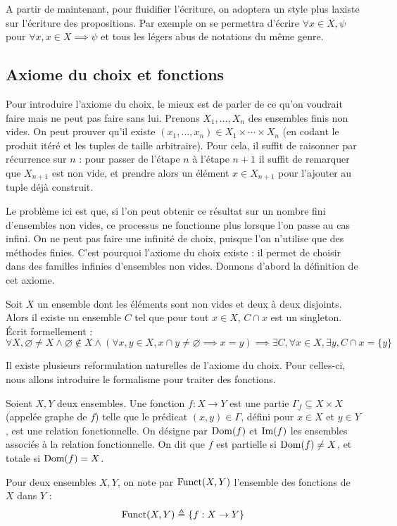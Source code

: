 \begin{notation}
  A partir de maintenant, pour fluidifier l'écriture, on adoptera un style plus
  laxiste sur l'écriture des propositions. Par exemple on se permettra d'écrire
  $\forall x \in X, \psi$ pour $\forall x, x\in X \implies \psi$ et tous les
  légers abus de notations du même genre.
\end{notation}

\subsection{Axiome du choix et fonctions}

Pour introduire l'axiome du choix, le mieux est de parler de ce qu'on voudrait
faire mais ne peut pas faire sans lui. Prenons $X_1,\ldots,X_n$ des ensembles
finis non vides. On peut prouver qu'il existe
$(x_1,\ldots,x_n)\in X_1\times\cdots\times X_n$ (en codant le produit itéré et
les tuples de taille arbitraire). Pour cela, il suffit de raisonner par
récurrence sur $n$ : pour passer de l'étape $n$ à l'étape $n+1$ il suffit de
remarquer que $X_{n+1}$ est non vide, et prendre alors un élément $x\in X_{n+1}$
pour l'ajouter au tuple déjà construit.

Le problème ici est que, si l'on peut obtenir ce résultat sur un nombre fini
d'ensembles non vides, ce processus ne fonctionne plus lorsque l'on passe au cas
infini. On ne peut pas faire une infinité de choix, puisque l'on n'utilise que
des méthodes finies. C'est pourquoi l'axiome du choix existe : il permet de
choisir dans des familles infinies d'ensembles non vides. Donnons d'abord la
définition de cet axiome.

\begin{axiom}[Choix]\label{ax.ZF.AC}
  Soit $X$ un ensemble dont les éléments sont non vides et deux à deux
  disjoints. Alors il existe un ensemble $C$ tel que pour tout $x\in X$,
  $C\cap x$ est un singleton. \'Ecrit formellement :
  \[
  \forall X, \varnothing\neq X \land \varnothing\notin X \land
  (\forall x,y \in X, x \cap y \neq
  \varnothing \implies x = y)
  \implies \exists C, \forall x \in X, \exists y, C \cap x = \{y\}
  \]
\end{axiom}

Il existe plusieurs reformulation naturelles de l'axiome du choix. Pour
celles-ci, nous allons introduire le formalisme pour traiter des fonctions.

\begin{definition}[Fonction]
  Soient $X,Y$ deux ensembles. Une fonction $f : X \to Y$ est une partie
  $\Gamma_f\subseteq X \times X$ (appelée graphe de $f$)  telle que le prédicat
  $(x,y)\in \Gamma$, défini pour $x\in X$ et $y\in Y$, est une relation
  fonctionnelle. On désigne par $\operatorname{Dom}(f)$ et $\operatorname{Im}(f)$ les ensembles associés à
  la relation fonctionnelle. On dit que $f$ est partielle si $\operatorname{Dom}(f) \neq X$,
  et totale si $\operatorname{Dom}(f) = X$.

  Pour deux ensembles $X,Y$, on note par $\operatorname{Funct}(X,Y)$ l'ensemble des fonctions
  de $X$ dans $Y$ :
  \[\operatorname{Funct}(X,Y) \triangleq \{f : X \to Y\}\]
\end{definition}

